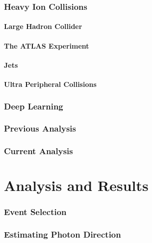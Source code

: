 \documentclass[a4paper,12pt,reqno]{article}
\begin{document}
\section{Heavy Ion Collisions}\label{sec:HI}

\subsection{Large Hadron Collider}\label{sec:LHC}

\subsection{The ATLAS Experiment}\label{sec:atlas}

\subsection{Jets}\label{sec:reco_jet}

\subsection{Ultra Peripheral Collisions}\label{sec:UPC}

\section{Deep Learning}\label{sec:ML}

\section{Previous Analysis}\label{sec:previous}

\section{Current Analysis}\label{sec:current}


\pagebreak

\part{Analysis and Results}

\section{Event Selection}\label{sec:event_selection}

\section{Estimating Photon Direction}\label{sec:photon_direction_methods}

\end{document}
